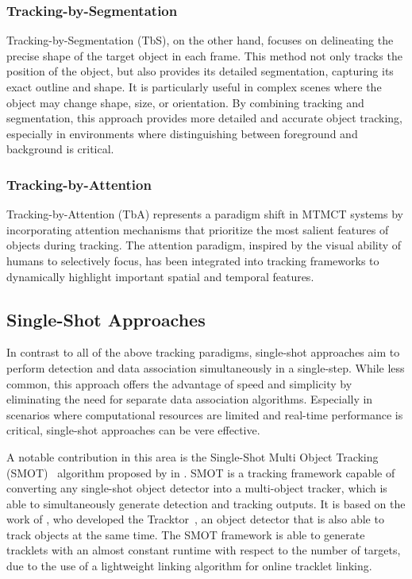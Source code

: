 \subsubsection{Tracking-by-Segmentation}\label{subsubsec:tracking-by-segmentation}
Tracking-by-Segmentation (TbS), on the other hand, focuses on delineating the precise shape of the target object in each frame. This method not only tracks the position of the object, but also provides its detailed segmentation, capturing its exact outline and shape. It is particularly useful in complex scenes where the object may change shape, size, or orientation. By combining tracking and segmentation, this approach provides more detailed and accurate object tracking, especially in environments where distinguishing between foreground and background is critical.

\subsubsection{Tracking-by-Attention}\label{subsubsec:tracking_by_attention}Tracking-by-Attention (TbA) represents a paradigm shift in MTMCT systems by incorporating attention mechanisms that prioritize the most salient features of objects during tracking. The attention paradigm, inspired by the visual ability of humans to selectively focus, has been integrated into tracking frameworks to dynamically highlight important spatial and temporal features.

\subsection{Single-Shot Approaches}\label{subsec:single-shot_approaches}
In contrast to all of the above tracking paradigms, single-shot approaches aim to perform detection and data association simultaneously in a single-step. While less common, this approach offers the advantage of speed and simplicity by eliminating the need for separate data association algorithms. Especially in scenarios where computational resources are limited and real-time performance is critical, single-shot approaches can be vere effective.

A notable contribution in this area is the Single-Shot Multi Object Tracking (SMOT)~\cite{Li20} algorithm proposed by \citeauthor{Li20} in \citeyear{Li20}. SMOT is a tracking framework capable of converting any single-shot object detector into a multi-object tracker, which is able to simultaneously generate detection and tracking outputs. It is based on the work of \citeauthor{Bergmann19}, who developed the Tracktor~\cite{Bergmann19}, an object detector that is also able to track objects at the same time. The SMOT framework is able to generate tracklets with an almost constant runtime with respect to the number of targets, due to the use of a lightweight linking algorithm for online tracklet linking.

